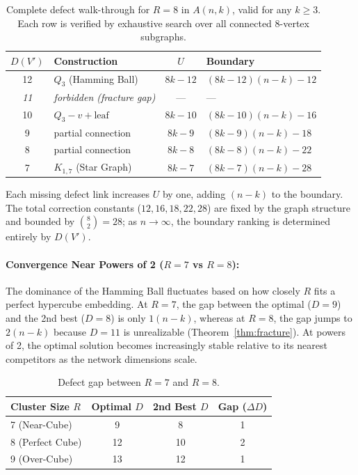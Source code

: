 \begin{table}[ht]
	\centering
	\caption{Complete defect walk-through for $R=8$ in $A(n,k)$, valid for any
	$k \ge 3$.  Each row is verified by exhaustive search over all connected
	$8$-vertex subgraphs.}
	\label{tab:walkthrough_r8}
	\begin{tabular}{@{}clcl@{}}
		\toprule
		$D(V')$   & Construction                    & $U$       & Boundary                \\
		\midrule
		12        & $Q_3$ (Hamming Ball)            & $8k{-}12$ & $(8k{-}12)(n{-}k) - 12$ \\
		\emph{11} & \emph{forbidden (fracture gap)} & ---       & ---                     \\
		10        & $Q_3 - v + \text{leaf}$         & $8k{-}10$ & $(8k{-}10)(n{-}k) - 16$ \\
		9         & partial connection              & $8k{-}9$  & $(8k{-}9)(n{-}k) - 18$  \\
		8         & partial connection              & $8k{-}8$  & $(8k{-}8)(n{-}k) - 22$  \\
		7         & $K_{1,7}$ (Star Graph)          & $8k{-}7$  & $(8k{-}7)(n{-}k) - 28$  \\
		\bottomrule
	\end{tabular}
\end{table}

\noindent Each missing defect link increases $U$ by one, adding $(n{-}k)$ to the
boundary. The total correction constants ($12, 16, 18, 22, 28$) are fixed by the
graph structure and bounded by $\binom{8}{2} = 28$; as $n \to \infty$, the
boundary ranking is determined entirely by $D(V')$.

\paragraph{Convergence Near Powers of 2 ($R=7$ vs $R=8$):}
The dominance of the Hamming Ball fluctuates based on how closely $R$ fits a
perfect hypercube embedding. At $R=7$, the gap between the optimal ($D=9$) and
the 2nd best ($D=8$) is only $1(n-k)$, whereas at $R=8$, the gap jumps to
$2(n-k)$ because $D=11$ is unrealizable (Theorem~\ref{thm:fracture}). At powers
of 2, the optimal solution becomes increasingly stable relative to its nearest
competitors as the network dimensions scale.

\begin{table}[ht]
	\centering
	\caption{Defect gap between $R=7$ and $R=8$.}
	\label{tab:gap_jump}
	\begin{tabular}{@{}lccc@{}}
		\toprule
		Cluster Size $R$ & Optimal $D$ & 2nd Best $D$ & Gap ($\Delta D$) \\
		\midrule
		7 (Near-Cube)    & 9           & 8            & 1                \\
		8 (Perfect Cube) & 12          & 10           & 2                \\
		9 (Over-Cube)    & 13          & 12           & 1                \\
		\bottomrule
	\end{tabular}
\end{table}

